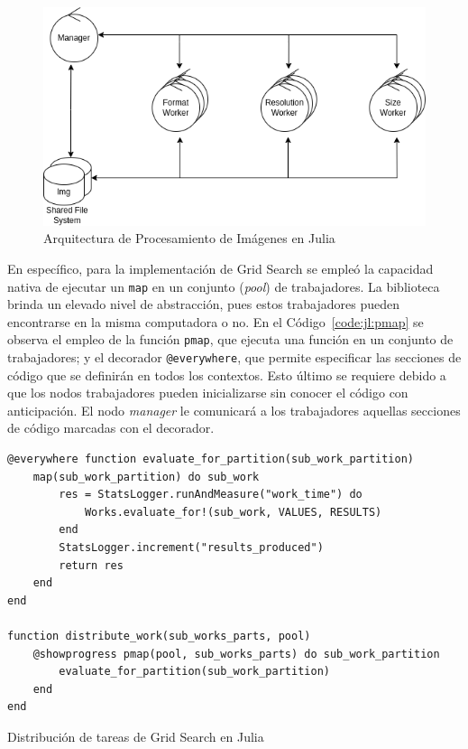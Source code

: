 \documentclass[11pt]{article}
\newcommand{\english}[1]{\textit{#1}}
\begin{document}
\begin{figure}[ht]
    \centering
    \includegraphics[scale=0.4]{resources/distributed_systems/jl/image_processing_arch.png}
    \caption{Arquitectura de Procesamiento de Imágenes en Julia}
    \label{fig:jl:image_processing_arch}
\end{figure}

En específico, para la implementación de Grid Search se empleó la capacidad nativa de ejecutar un \lstinline{map} en un conjunto (\english{pool}) de trabajadores. La biblioteca brinda un elevado nivel de abstracción, pues estos trabajadores pueden encontrarse en la misma computadora o no. En el Código~\ref{code:jl:pmap} se observa el empleo de la función \lstinline{pmap}, que ejecuta una función en un conjunto de trabajadores; y el decorador \lstinline{@everywhere}, que permite especificar las secciones de código que se definirán en todos los contextos. Esto último se requiere debido a que los nodos trabajadores pueden inicializarse sin conocer el código con anticipación. El nodo \english{manager} le comunicará a los trabajadores aquellas secciones de código marcadas con el decorador.

\begin{listing}[ht]
\begin{verbatim}
@everywhere function evaluate_for_partition(sub_work_partition)
    map(sub_work_partition) do sub_work
        res = StatsLogger.runAndMeasure("work_time") do
            Works.evaluate_for!(sub_work, VALUES, RESULTS)
        end
        StatsLogger.increment("results_produced")
        return res
    end
end

function distribute_work(sub_works_parts, pool)
    @showprogress pmap(pool, sub_works_parts) do sub_work_partition
        evaluate_for_partition(sub_work_partition)
    end
end
\end{verbatim}
\caption{Distribución de tareas de Grid Search en Julia}
\label{code:jl:pmap}
\end{listing}
\end{document}
